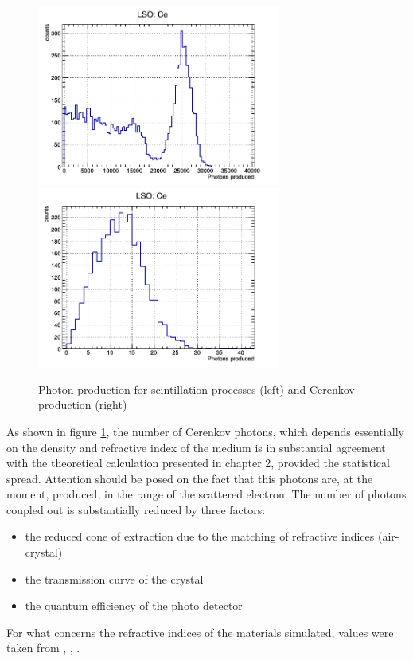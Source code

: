 \begin{figure}[htbp]
\begin{center}
\includegraphics[width=8cm]{../Pictures/Chapter_5/spctrum_LSO.png}
\includegraphics[width=8cm]{../Pictures/Chapter_5/cerenkov_LSO.png}
\end{center}
\caption[LSO photoelectric and Cerenkov production]{Photon production for scintillation processes (left) and Cerenkov production (right)}
\label{fig:ceren_phot}
\end{figure}
As shown in figure \ref{fig:ceren_phot}, the number of Cerenkov photons, which depends essentially on the density and refractive index of the medium is in substantial agreement with the theoretical calculation presented in chapter 2, provided the statistical spread.
Attention should be posed on the fact that this photons are, at the moment, produced, in the range of the scattered electron. 
The number of photons coupled out is substantially reduced by three factors: 
\begin{itemize}
\item the reduced cone of extraction due to the matching of refractive indices (air-crystal)
\item the transmission curve of the crystal
\item the quantum efficiency of the photo detector
\end{itemize}
For what concerns the refractive indices of the materials simulated, values were taken from \cite{Auffray2009}, \cite{Kuwano2004}, \cite{jellison2012}.
